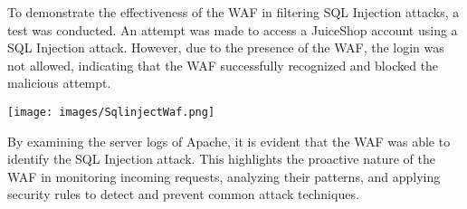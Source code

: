 \documentclass[12pt]{article}
\begin{document}
\begin{table}[]
\end{table}
To demonstrate the effectiveness of the WAF in filtering SQL Injection attacks, a test was conducted. An attempt was made to access a JuiceShop account using a SQL Injection attack. However, due to the presence of the WAF, the login was not allowed, indicating that the WAF successfully recognized and blocked the malicious attempt.


\begin{center}
    \texttt{[image: images/SqlinjectWaf.png]}
\end{center}

By examining the server logs of Apache, it is evident that the WAF was able to identify the SQL Injection attack. This highlights the proactive nature of the WAF in monitoring incoming requests, analyzing their patterns, and applying security rules to detect and prevent common attack techniques.\\
\end{document}
